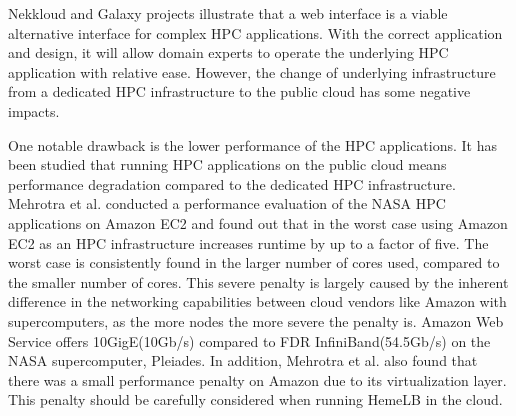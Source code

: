 %
%
%

Nekkloud and Galaxy projects illustrate that a web interface is a viable alternative interface for complex HPC applications. With the correct application and design, it will allow domain experts to operate the underlying HPC application with relative ease. However,  the change of underlying infrastructure from a dedicated HPC infrastructure to the public cloud has some negative impacts.

One notable drawback is the lower performance of the HPC applications. It has been studied that running HPC applications on the public cloud means performance degradation compared to the dedicated HPC infrastructure. Mehrotra et al. \citep{mehrotra2012performance} conducted a performance evaluation of the NASA HPC applications on Amazon EC2 and found out that in the worst case using Amazon EC2 as an HPC infrastructure increases runtime by up to a factor of five. The worst case is consistently found in the larger number of cores used, compared to the smaller number of cores. This severe penalty is largely caused by the inherent difference in the networking capabilities between cloud vendors like Amazon with supercomputers, as the more nodes the more severe the penalty is.  Amazon Web Service offers 10GigE(10Gb/s) compared to FDR InfiniBand(54.5Gb/s) on the NASA supercomputer, Pleiades. In addition, Mehrotra et al. also found that there was a small performance penalty on Amazon due to its virtualization layer. This  penalty should be carefully considered when running HemeLB in the cloud.

